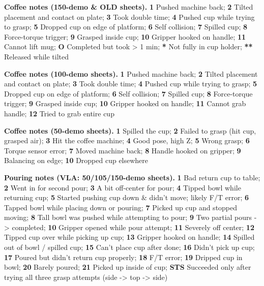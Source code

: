 \documentclass[10pt]{article}
\begin{document}
\noindent\footnotesize\textbf{Coffee notes (150-demo \& OLD sheets).} \textbf{1} Pushed machine back; \textbf{2} Tilted placement and contact on plate; \textbf{3} Took double time; \textbf{4} Pushed cup while trying to grasp; \textbf{5} Dropped cup on edge of platform; \textbf{6} Self collision; \textbf{7} Spilled cup; \textbf{8} Force-torque trigger; \textbf{9} Grasped inside cup; \textbf{10} Gripper hooked on handle; \textbf{11} Cannot lift mug; \textbf{O} Completed but took > 1 min; \textbf{*} Not fully in cup holder; \textbf{**} Released while tilted\normalsize\par\medskip
\noindent\footnotesize\textbf{Coffee notes (100-demo sheets).} \textbf{1} Pushed machine back; \textbf{2} Tilted placement and contact on plate; \textbf{3} Took double time; \textbf{4} Pushed cup while trying to grasp; \textbf{5} Dropped cup on edge of platform; \textbf{6} Self collision; \textbf{7} Spilled cup; \textbf{8} Force-torque trigger; \textbf{9} Grasped inside cup; \textbf{10} Gripper hooked on handle; \textbf{11} Cannot grab handle; \textbf{12} Tried to grab entire cup\normalsize\par\medskip
\noindent\footnotesize\textbf{Coffee notes (50-demo sheets).} \textbf{1} Spilled the cup; \textbf{2} Failed to grasp (hit cup, grasped air); \textbf{3} Hit the coffee machine; \textbf{4} Good pose, high Z; \textbf{5} Wrong grasp; \textbf{6} Torque sensor error; \textbf{7} Moved machine back; \textbf{8} Handle hooked on gripper; \textbf{9} Balancing on edge; \textbf{10} Dropped cup elsewhere\normalsize\par\medskip
\noindent\footnotesize\textbf{Pouring notes (VLA: 50/105/150-demo sheets).} \textbf{1} Bad return cup to table; \textbf{2} Went in for second pour; \textbf{3} A bit off-center for pour; \textbf{4} Tipped bowl while returning cup; \textbf{5} Started pushing cup down \& didn't move; likely F/T error; \textbf{6} Tapped bowl while placing down or pouring; \textbf{7} Picked up cup and stopped moving; \textbf{8} Tall bowl was pushed while attempting to pour; \textbf{9} Two partial pours -> completed; \textbf{10} Gripper opened while pour attempt; \textbf{11} Severely off center; \textbf{12} Tipped cup over while picking up cup; \textbf{13} Gripper hooked on handle; \textbf{14} Spilled out of bowl / spilled cup; \textbf{15} Can't place cup after done; \textbf{16} Didn't pick up cup; \textbf{17} Poured but didn't return cup properly; \textbf{18} F/T error; \textbf{19} Dripped cup in bowl; \textbf{20} Barely poured; \textbf{21} Picked up inside of cup; \textbf{STS} Succeeded only after trying all three grasp attempts (side -> top -> side)\normalsize\par\medskip
\end{document}
